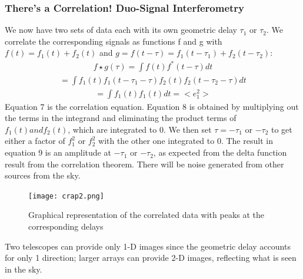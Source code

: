 \documentclass{article}
\begin{document}
\subsubsection{There's a Correlation! Duo-Signal Interferometry}
We now have two sets of data each with its own geometric delay
$\tau_{1}$ or $\tau_{2}$. We correlate the corresponding signals as
functions f and g with $f(t) = f_{1}(t) + f_{2}(t)$ and $g = f(t-\tau) =
f_{1}(t-\tau_{1}) + f_{2}(t-\tau_{2})$:
\begin{align}f\star{g}(\tau) = \int{f(t)f^{\ast}(t-\tau)dt} 
\end{align}
\begin{align}=
  \int{f_{1}(t)f_{1}(t-\tau_{1}-\tau)f_{2}(t)f_{2}(t-\tau_{2}-\tau)dt}
\end{align}
\begin{align}= \int{f_{1}(t)f_{1}(t)dt} = <e_{1}^{2}>
\end{align}
Equation 7 is the correlation equation. Equation 8 is obtained by
multiplying out the terms in the integrand and eliminating the product 
terms of $f_{1}(t) and f_{2}(t)$, which are integrated to 0. We then set 
$\tau = -\tau_{1}$ or $-\tau_{2}$ to get either a factor of $f_{1}^{2}$
or $f_{2}^{2}$ with the other one integrated to 0. The result in
equation 9 is an amplitude at $-\tau_{1}$ or $-\tau_{2}$, as expected
from the delta function result from the correlation theorem. There will 
be noise generated from other sources from the sky.
\begin{figure}[!h]
\centering
\texttt{[image: crap2.png]}
\caption{Graphical representation of the correlated data with peaks at
  the corresponding delays}
\end{figure}
Two telescopes can provide only 1-D images since the geometric delay
accounts for only 1 direction; larger arrays can provide 2-D images,
reflecting what is seen in the sky.
\end{document}
